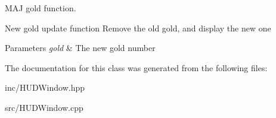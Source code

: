 M\+A\+J gold function. 

New gold update function Remove the old gold, and display the new one 
\begin{DoxyParams}{Parameters}
{\em gold} & The new gold number \\
\hline
\end{DoxyParams}


The documentation for this class was generated from the following files\+:\begin{DoxyCompactItemize}
\item 
inc/H\+U\+D\+Window.\+hpp\item 
src/H\+U\+D\+Window.\+cpp\end{DoxyCompactItemize}

